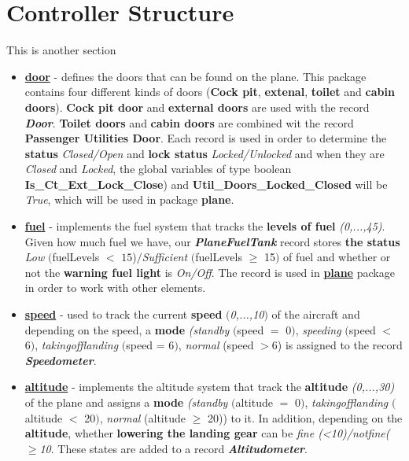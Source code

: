 \documentclass{llncs}
\begin{document}
\section{Controller Structure}
This is another section
\begin{itemize}
\item \textbf{\underline{door}} - defines the doors that can be found on the plane. This package contains four different kinds of doors ({\textbf{Cock pit}}, {\textbf{extenal}}, {\textbf{toilet}} and {\textbf{cabin doors}}). {\textbf{Cock pit door}} and {\textbf{external doors}} are used with the record {\textbf{\textit{Door}}}. {\textbf{Toilet doors}} and {\textbf{cabin doors}} are combined wit the record {\textbf{Passenger Utilities Door}}. Each record is used in order to determine the \textbf{status } \textit{Closed/Open} and \textbf{lock status} \textit{Locked/Unlocked} and when they are \textit{Closed} and \textit{Locked}, the global variables of type boolean {\textbf{Is\_Ct\_Ext\_Lock\_Close}}) and {\textbf{Util\_Doors\_Locked\_Closed}} will be \textit{True}, which will be used in package \textbf{plane}.
\item \textbf{\underline{fuel}} - implements the fuel system that tracks the {\textbf{levels of fuel}} \textit{(0,...,45)}. Given how much fuel we have, our {\textbf{\textit{PlaneFuelTank}}} record stores {\textbf{the status}}  \textit{Low} $($fuelLevels $<$ $15$)$/$\textit{Sufficient} $($fuelLevels $\geqslant$ 15$)$ of fuel and whether or not the {\textbf{warning fuel light}} is \textit{On/Off}. The record is used in \textbf{\underline{plane}} package in order to work with other elements.
\item \textbf{\underline{speed}} - used to track the current {\textbf{speed}} \textit{$($0,...,10$)$} of the aircraft and depending on the speed, a {\textbf{mode}} \textit{(standby} $($speed $=$ 0$)$, \textit{speeding} $($speed $<$ 6$)$, \textit{takingofflanding} $($speed = 6$)$, \textit{normal} (speed $>6$) is assigned to the record {\textbf{\textit{Speedometer}}}.
\item \textbf{\underline{altitude}} - implements the altitude system that track the {\textbf{altitude}} \textit{(0,...,30)} of the plane and assigns a {\textbf{mode}} \textit{(standby} $($altitude $=$ 0$)$, \textit{takingofflanding} $($altitude $<$ 20$)$, \textit{normal} (altitude $\geqslant$ 20)) to it. In addition, depending on the {\textbf{altitude}}, whether {\textbf{lowering the landing gear}}  can be \textit{fine (<10)/notfine($\geqslant$10}. These states are added to a record {\textbf{\textit{Altitudometer}}}.

\end{itemize}
\end{document}
